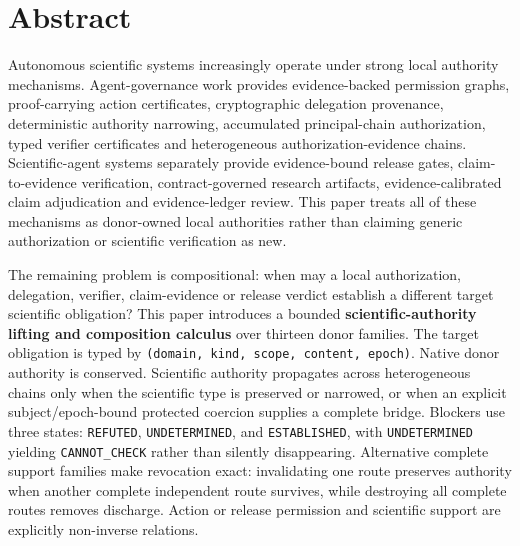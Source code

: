 \section*{Abstract}

Autonomous scientific systems increasingly operate under strong local authority mechanisms. Agent-governance work provides evidence-backed permission graphs, proof-carrying action certificates, cryptographic delegation provenance, deterministic authority narrowing, accumulated principal-chain authorization, typed verifier certificates and heterogeneous authorization-evidence chains. Scientific-agent systems separately provide evidence-bound release gates, claim-to-evidence verification, contract-governed research artifacts, evidence-calibrated claim adjudication and evidence-ledger review. This paper treats all of these mechanisms as donor-owned local authorities rather than claiming generic authorization or scientific verification as new.

The remaining problem is compositional: when may a local authorization, delegation, verifier, claim-evidence or release verdict establish a different target scientific obligation? This paper introduces a bounded \textbf{scientific-authority lifting and composition calculus} over thirteen donor families. The target obligation is typed by \texttt{(domain, kind, scope, content, epoch)}. Native donor authority is conserved. Scientific authority propagates across heterogeneous chains only when the scientific type is preserved or narrowed, or when an explicit subject/epoch-bound protected coercion supplies a complete bridge. Blockers use three states: \texttt{REFUTED}, \texttt{UNDETERMINED}, and \texttt{ESTABLISHED}, with \texttt{UNDETERMINED} yielding \texttt{CANNOT_CHECK} rather than silently disappearing. Alternative complete support families make revocation exact: invalidating one route preserves authority when another complete independent route survives, while destroying all complete routes removes discharge. Action or release permission and scientific support are explicitly non-inverse relations.

